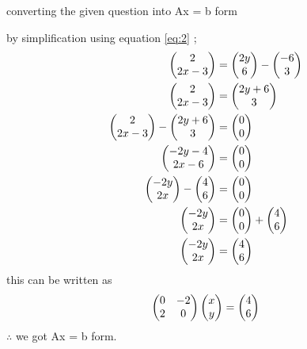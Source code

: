 \documentclass[journal,12pt,twocolumn]{IEEEtran}
\begin{document}
      \newpage
      converting the given question into Ax = b form 

      by simplification using equation \eqref{eq:2} ;
      \begin{align}
      \myvec{2\\2x-3 } &= \myvec{2y\\6} - \myvec{-6\\3} 
      \\ 
      \myvec{2\\2x-3 } &= \myvec{2y+6\\3}
      \\ 
      \myvec{2\\2x-3 } - \myvec{2y+6\\3} &= \myvec{0\\0}
      \\
      \myvec{-2y-4\\2x-6 } &= \myvec{0\\0}
      \\
      \myvec{-2y\\2x} -\myvec{4\\6} &= \myvec{0\\0}
      \\
      \myvec{-2y\\2x } &= \myvec{0\\0} + \myvec{4\\6}
      \\
      \myvec{-2y\\2x } &= \myvec{4\\6}
      \end{align}
      this can be written as 
     \begin{align}
     \myvec{0 & -2\\2 & 0} \myvec{x\\y}= \myvec{4\\6}
     \end{align}
     $\therefore$ we got Ax = b form.  
\end{document}
